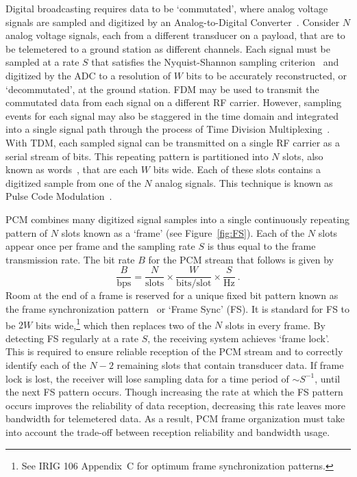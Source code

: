 \documentclass{ws-jai}
\begin{document}
Digital broadcasting requires data to be `commutated', where analog voltage signals are sampled and digitized by an Analog-to-Digital Converter~\cite[ADC;][]{Horowitz89,Wertz99}. Consider $N$ analog voltage signals, each from a different transducer on a payload, that are to be telemetered to a ground station as different channels. Each signal must be sampled at a rate $S$ that satisfies the Nyquist-Shannon sampling criterion~\cite{Shannon49} and digitized by the ADC to a resolution of $W$ bits to be accurately reconstructed, or `decommutated', at the ground station. FDM may be used to transmit the commutated data from each signal on a different RF carrier. However, sampling events for each signal may also be staggered in the time domain and integrated into a single signal path through the process of Time Division Multiplexing~\cite[TDM;][]{Plonus01,TMapp06}. With TDM, each sampled signal can be transmitted on a single RF carrier as a serial stream of bits. This repeating pattern is partitioned into $N$ slots, also known as words~\cite{Mano08}, that are each $W$ bits wide. Each of these slots contains a digitized sample from one of the $N$ analog signals. This technique is known as Pulse Code Modulation~\cite[PCM;][]{Plonus01,TMapp06}.

PCM combines many digitized signal samples into a single continuously repeating pattern of $N$ slots known as a `frame' (see Figure~\ref{fig:FS}). Each of the $N$ slots appear once per frame and the sampling rate $S$ is thus equal to the frame transmission rate. The bit rate $B$ for the PCM stream that follows is given by
\begin{equation}\label{eq:bit_rate}
\frac{B}{\text{bps}}=\frac{N}{\text{slots}}\times\frac{W}{\text{bits/slot}}\times\frac{S}{\text{Hz}} \: .
\end{equation}
Room at the end of a frame is reserved for a unique fixed bit pattern known as the frame synchronization pattern~\cite{Scholtz80} or `Frame Sync' (FS). It is standard for FS to be $2W$ bits wide,\footnote{See IRIG 106 Appendix~C for optimum frame synchronization patterns.} which then replaces two of the $N$ slots in every frame. By detecting FS regularly at a rate $S$, the receiving system achieves `frame lock'. This is required to ensure reliable reception of the PCM stream and to correctly identify each of the $N-2$ remaining slots that contain transducer data. If frame lock is lost, the receiver will lose sampling data for a time period of $\sim S^{-1}$, until the next FS pattern occurs. Though increasing the rate at which the FS pattern occurs improves the reliability of data reception, decreasing this rate leaves more bandwidth for telemetered data. As a result, PCM frame organization must take into account the trade-off between reception reliability and bandwidth usage. 
\end{document}
